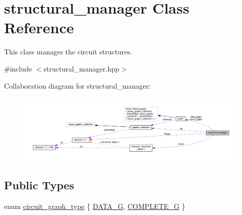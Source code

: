 \hypertarget{classstructural__manager}{}\section{structural\+\_\+manager Class Reference}
\label{classstructural__manager}


This class manages the circuit structures.  




{\ttfamily \#include $<$structural\+\_\+manager.\+hpp$>$}



Collaboration diagram for structural\+\_\+manager\+:
\nopagebreak
\begin{figure}[H]
\begin{center}
\leavevmode
\includegraphics[width=350pt]{d4/d5d/classstructural__manager__coll__graph}
\end{center}
\end{figure}
\subsection*{Public Types}
\begin{DoxyCompactItemize}
\item 
enum \hyperlink{classstructural__manager_a3ddbeaa6139edd572bbba57042d0a130}{circuit\+\_\+graph\+\_\+type} \{ \hyperlink{classstructural__manager_a3ddbeaa6139edd572bbba57042d0a130a1693a88797cfeafe0daab8a944040fa7}{D\+A\+T\+A\+\_\+G}, 
\hyperlink{classstructural__manager_a3ddbeaa6139edd572bbba57042d0a130ae146a36ef45766fd339bb94010337a3a}{C\+O\+M\+P\+L\+E\+T\+E\+\_\+G}
 \}
\end{DoxyCompactItemize}
